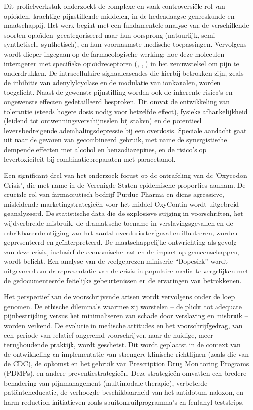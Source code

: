 \documentclass[11pt, a4paper]{report} %
\begin{document}
Dit profielwerkstuk onderzoekt de complexe en vaak controversiële rol van opioïden, krachtige pijnstillende middelen, in de hedendaagse geneeskunde en maatschappij. Het werk begint met een fundamentele analyse van de verschillende soorten opioïden, gecategoriseerd naar hun oorsprong (natuurlijk, semi-synthetisch, synthetisch), en hun voornaamste medische toepassingen. Vervolgens wordt dieper ingegaan op de farmacologische werking: hoe deze moleculen interageren met specifieke opioïdreceptoren (\textmu, \textkappa, \textdelta) in het zenuwstelsel om pijn te onderdrukken. De intracellulaire signaalcascades die hierbij betrokken zijn, zoals de inhibitie van adenylylcyclase en de modulatie van ionkanalen, worden toegelicht. Naast de gewenste pijnstilling worden ook de inherente risico's en ongewenste effecten gedetailleerd besproken. Dit omvat de ontwikkeling van tolerantie (steeds hogere dosis nodig voor hetzelfde effect), fysieke afhankelijkheid (leidend tot ontwenningsverschijnselen bij staken) en de potentieel levensbedreigende ademhalingsdepressie bij een overdosis. Speciale aandacht gaat uit naar de gevaren van gecombineerd gebruik, met name de synergistische dempende effecten met alcohol en benzodiazepines, en de risico's op levertoxiciteit bij combinatiepreparaten met paracetamol.

Een significant deel van het onderzoek focust op de ontrafeling van de 'Oxycodon Crisis', die met name in de Verenigde Staten epidemische proporties aannam. De cruciale rol van farmaceutisch bedrijf Purdue Pharma en diens agressieve, misleidende marketingstrategieën voor het middel OxyContin wordt uitgebreid geanalyseerd. De statistische data die de explosieve stijging in voorschriften, het wijdverbreide misbruik, de dramatische toename in verslavingsgevallen en de schrikbarende stijging van het aantal overdosissterfgevallen illustreren, worden gepresenteerd en geïnterpreteerd. De maatschappelijke ontwrichting als gevolg van deze crisis, inclusief de economische last en de impact op gemeenschappen, wordt belicht. Een analyse van de veelgeprezen miniserie \enquote{Dopesick} wordt uitgevoerd om de representatie van de crisis in populaire media te vergelijken met de gedocumenteerde feitelijke gebeurtenissen en de ervaringen van betrokkenen.

Het perspectief van de voorschrijvende artsen wordt vervolgens onder de loep genomen. De ethische dilemma's waarmee zij worstelen – de plicht tot adequate pijnbestrijding versus het minimaliseren van schade door verslaving en misbruik – worden verkend. De evolutie in medische attitudes en het voorschrijfgedrag, van een periode van relatief ongeremd voorschrijven naar de huidige, meer terughoudende praktijk, wordt geschetst. Dit wordt geplaatst in de context van de ontwikkeling en implementatie van strengere klinische richtlijnen (zoals die van de CDC), de opkomst en het gebruik van Prescription Drug Monitoring Programs (PDMPs), en andere preventiestrategieën. Deze strategieën omvatten een bredere benadering van pijnmanagement (multimodale therapie), verbeterde patiënteneducatie, de verhoogde beschikbaarheid van het antidotum naloxon, en harm reduction-initiatieven zoals spuitomruilprogramma's en fentanyl-teststrips.
\end{document}
